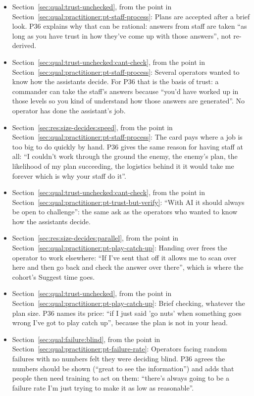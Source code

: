 \begin{itemize}[leftmargin=1.2em,itemsep=1pt]
\item Section~\ref{sec:qual:trust-unchecked}, from the point in Section~\ref{sec:qual:practitioner:pt-staff-process}: Plans are accepted after a brief look. P36 explains why that can be rational: answers from staff are taken ``as long as you have trust in how they've come up with those answers'', not re-derived.
\item Section~\ref{sec:qual:trust-unchecked:cant-check}, from the point in Section~\ref{sec:qual:practitioner:pt-staff-process}: Several operators wanted to know how the assistants decide. For P36 that is the basis of trust: a commander can take the staff's answers because ``you'd have worked up in those levels so you kind of understand how those answers are generated''. No operator has done the assistant's job.
\item Section~\ref{sec:res:size-decides:speed}, from the point in Section~\ref{sec:qual:practitioner:pt-staff-process}: The card pays where a job is too big to do quickly by hand. P36 gives the same reason for having staff at all: ``I couldn't work through the ground the enemy, the enemy's plan, the likelihood of my plan succeeding, the logistics behind it it would take me forever which is why your staff do it''.
\item Section~\ref{sec:qual:trust-unchecked:cant-check}, from the point in Section~\ref{sec:qual:practitioner:pt-trust-but-verify}: ``With AI it should always be open to challenge'': the same ask as the operators who wanted to know how the assistants decide.
\item Section~\ref{sec:res:size-decides:parallel}, from the point in Section~\ref{sec:qual:practitioner:pt-play-catch-up}: Handing over frees the operator to work elsewhere: ``If I've sent that off it allows me to scan over here and then go back and check the answer over there'', which is where the cohort's Suggest time goes.
\item Section~\ref{sec:qual:trust-unchecked}, from the point in Section~\ref{sec:qual:practitioner:pt-play-catch-up}: Brief checking, whatever the plan size. P36 names its price: ``if I just said 'go nuts' when something goes wrong I've got to play catch up'', because the plan is not in your head.
\item Section~\ref{sec:qual:failure:blind}, from the point in Section~\ref{sec:qual:practitioner:pt-failure-rate}: Operators facing random failures with no numbers felt they were deciding blind. P36 agrees the numbers should be shown (``great to see the information'') and adds that people then need training to act on them: ``there's always going to be a failure rate I'm just trying to make it as low as reasonable''.

\end{itemize}
